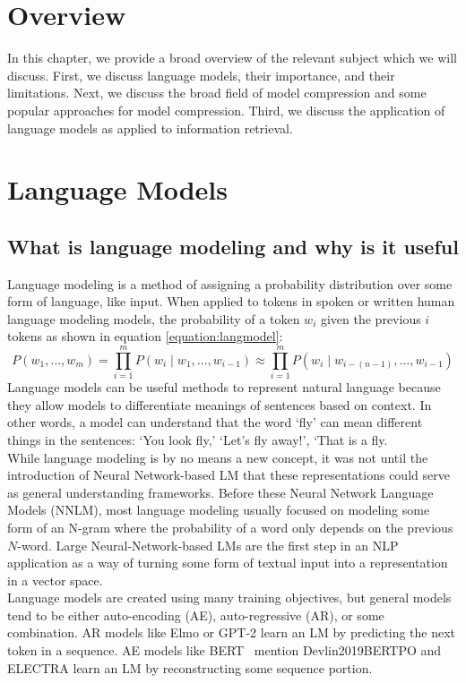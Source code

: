 \section{Overview}
In this chapter, we provide a broad overview of the relevant subject which we will discuss. First, we discuss language models, their importance, and their limitations. Next, we discuss the broad field of model compression and some popular approaches for model compression. Third, we discuss the application of language models as applied to information retrieval. 
\section{Language Models}
\subsection{What is language modeling and why is it useful}
Language modeling is a method of assigning a probability distribution over some form of language, like input. When applied to tokens in spoken or written human language modeling models, the probability of a token $w_i$ given the previous $i$ tokens as shown in equation \ref{equation:langmodel}:
\begin{equation}
    P(w_{1},\ldots ,w_{m})=\prod _{i=1}^{m}P(w_{i}\mid w_{1},\ldots ,w_{i-1})\approx \prod _{i=1}^{m}P(w_{i}\mid w_{i-(n-1)},\ldots ,w_{i-1})
\label{equation:langmodel}
\end{equation} Language models can be useful methods to represent natural language because they allow models to differentiate meanings of sentences based on context. In other words, a model can understand that the word `fly' can mean different things in the sentences: `You look fly,' `Let's fly away!', `That is a fly. \\
While language modeling is by no means a new concept, it was not until the introduction of Neural Network-based LM that these representations could serve as general understanding frameworks. Before these Neural Network Language Models (NNLM), most language modeling usually focused on modeling some form of an N-gram where the probability of a word only depends on the previous $N$-word. Large Neural-Network-based LMs are the first step in an NLP application as a way of turning some form of textual input into a representation in a vector space. \\
Language models are created using many training objectives, but general models tend to be either auto-encoding (AE), auto-regressive (AR), or some combination. AR models like Elmo \cite{Peters2018DeepCW} or GPT-2 \cite{Radford2019LanguageMA} learn an LM by predicting the next token in a sequence. AE models like BERT \ mention {Devlin2019BERTPO} and ELECTRA \cite{Clark2020ELECTRAPT} learn an LM by reconstructing some sequence portion.
